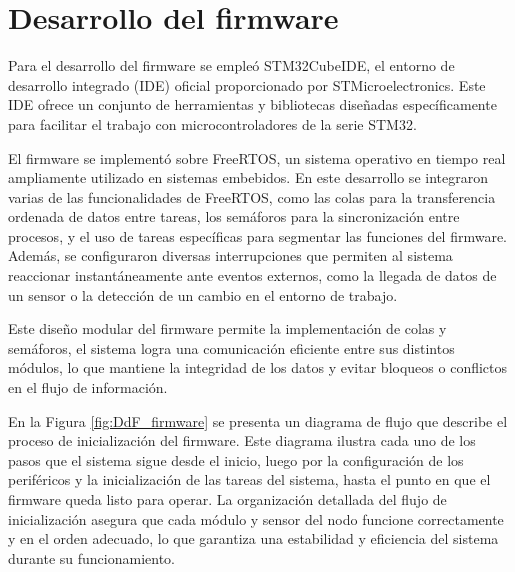 \section{Desarrollo del firmware}

Para el desarrollo del firmware se empleó STM32CubeIDE, el entorno de desarrollo integrado (IDE) oficial proporcionado por STMicroelectronics. Este IDE ofrece un conjunto de herramientas y bibliotecas diseñadas específicamente para facilitar el trabajo con microcontroladores de la serie STM32. 

El firmware se implementó sobre FreeRTOS, un sistema operativo en tiempo real ampliamente utilizado en sistemas embebidos. En este desarrollo se integraron varias de las funcionalidades de FreeRTOS, como las colas para la transferencia ordenada de datos entre tareas, los semáforos para la sincronización entre procesos, y el uso de tareas específicas para segmentar las funciones del firmware. Además, se configuraron diversas interrupciones que permiten al sistema reaccionar instantáneamente ante eventos externos, como la llegada de datos de un sensor o la detección de un cambio en el entorno de trabajo.

Este diseño modular del firmware permite la implementación de colas y semáforos, el sistema logra una comunicación eficiente entre sus distintos módulos, lo que mantiene la integridad de los datos y evitar bloqueos o conflictos en el flujo de información.

En la Figura \ref{fig:DdF_firmware} se presenta un diagrama de flujo que describe el proceso de inicialización del firmware. Este diagrama ilustra cada uno de los pasos que el sistema sigue desde el inicio, luego por la configuración de los periféricos y la inicialización de las tareas del sistema, hasta el punto en que el firmware queda listo para operar. La organización detallada del flujo de inicialización asegura que cada módulo y sensor del nodo funcione correctamente y en el orden adecuado, lo que garantiza una estabilidad y eficiencia del sistema durante su funcionamiento.

